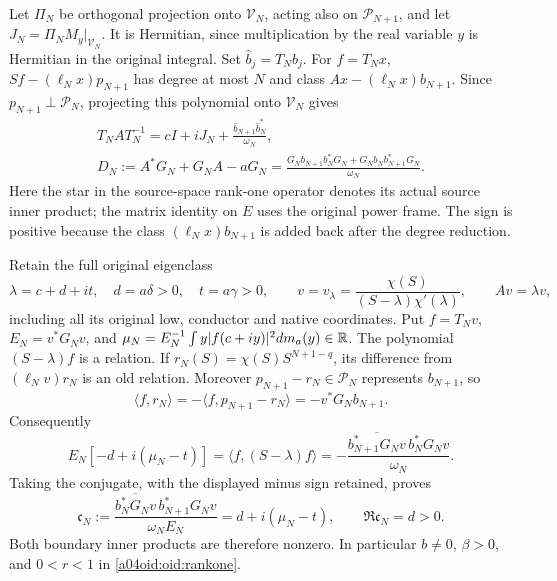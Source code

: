 Let $\Pi_N$ be orthogonal projection onto $\mathcal V_N$, acting
also on $\mathcal P_{N+1}$, and let
$J_N=\Pi_N M_y|_{\mathcal V_N}$. It is Hermitian, since
multiplication by the real variable $y$ is Hermitian in the original
integral. Set $\widehat b_j=T_Nb_j$. For $f=T_Nx$,
$Sf-(\ell_Nx)p_{N+1}$ has degree at most $N$ and class
$Ax-(\ell_Nx)b_{N+1}$. Since $p_{N+1}\perp\mathcal P_N$,
projecting this polynomial onto $\mathcal V_N$ gives
\begin{equation}\label{a04oid:oid:action}
 \begin{gathered}
 T_NAT_N^{-1}=cI+iJ_N+
 \frac{\widehat b_{N+1}\widehat b_N^*}{\omega_N},\\
 D_N:=A^*G_N+G_NA-aG_N
 =\frac{G_Nb_{N+1}b_N^*G_N+G_Nb_Nb_{N+1}^*G_N}{\omega_N}.
 \end{gathered}
\end{equation}
Here the star in the source-space rank-one operator denotes its
actual source inner product; the matrix identity on $E$ uses the
original power frame. The sign is positive because the class
$(\ell_Nx)b_{N+1}$ is added back after the degree reduction.

Retain the full original eigenclass
\begin{equation}\label{a04oid:oid:eigen}
 \lambda=c+d+it,\quad d=a\delta>0,\quad t=a\gamma>0,
 \qquad v=v_\lambda=\frac{\chi(S)}{(S-\lambda)\chi'(\lambda)},
 \qquad Av=\lambda v,
\end{equation}
including all its original low, conductor and native coordinates.
Put $f=T_Nv$, $E_N=v^*G_Nv$, and
$\mu_N=E_N^{-1}\int y|f(c+iy)|^2dm_a(y)\in\mathbb R$.
The polynomial $(S-\lambda)f$ is a relation. If
$r_N(S)=\chi(S)S^{N+1-q}$, its difference from
$(\ell_Nv)r_N$ is an old relation. Moreover
$p_{N+1}-r_N\in\mathcal P_N$ represents $b_{N+1}$, so
\[
 \langle f,r_N\rangle=-\langle f,p_{N+1}-r_N\rangle
 =-v^*G_Nb_{N+1}.
\]
Consequently
\[
 E_N[-d+i(\mu_N-t)]
 =\langle f,(S-\lambda)f\rangle
 =-\frac{\overline{b_{N+1}^*G_Nv}\,b_N^*G_Nv}{\omega_N}.
\]
Taking the conjugate, with the displayed minus sign retained, proves
\begin{equation}\label{a04oid:oid:current}
 \mathfrak c_N
 :=\frac{\overline{b_N^*G_Nv}\,b_{N+1}^*G_Nv}
 {\omega_NE_N}
 =d+i(\mu_N-t),\qquad \Re\mathfrak c_N=d>0.
\end{equation}
Both boundary inner products are therefore nonzero. In particular
$b\ne0$, $\beta>0$, and $0<r<1$ in \eqref{a04oid:oid:rankone}.

